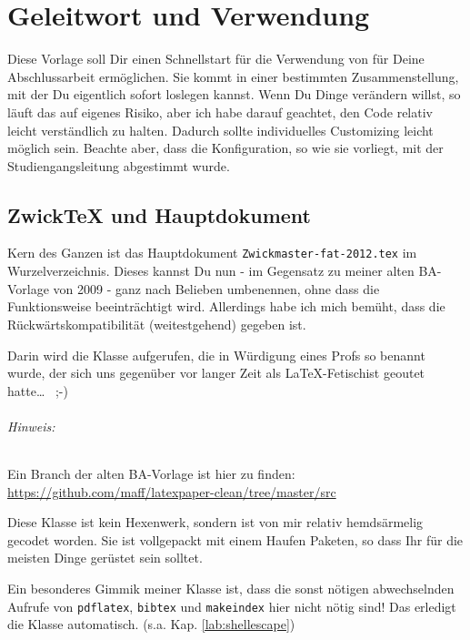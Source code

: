 

\nocite{*} 	



\chapter{Geleitwort und Verwendung}
\label{kap:Geleitwort}

Diese Vorlage soll Dir einen Schnellstart für die Verwendung von \latex für Deine Abschlussarbeit ermöglichen.  Sie kommt in einer bestimmten Zusammenstellung, mit der Du eigentlich sofort loslegen kannst. Wenn Du Dinge verändern willst, so läuft das auf eigenes Risiko, aber ich habe darauf geachtet, den Code relativ leicht verständlich zu halten. Dadurch sollte individuelles Customizing leicht möglich sein. Beachte aber, dass die Konfiguration, so wie sie vorliegt, mit der Studiengangsleitung abgestimmt wurde.

\section*{ZwickTeX und Hauptdokument}

Kern des Ganzen ist das Hauptdokument \texttt{Zwickmaster-fat-2012.tex} im Wurzelverzeichnis. Dieses kannst Du nun - im Gegensatz zu meiner alten BA-Vorlage von 2009 - ganz nach Belieben umbenennen, ohne dass die Funktionsweise beeinträchtigt wird. Allerdings habe ich mich bemüht, dass die Rückwärtskompatibilität (weitestgehend) gegeben ist.

Darin wird die Klasse \zwicktex\xspace aufgerufen, die in Würdigung eines Profs so benannt wurde, der sich uns gegenüber vor langer Zeit als \LaTeX-Fetischist geoutet hatte… ~;-)

\subparagraph*{Hinweis:} Ein Branch der alten BA-Vorlage ist hier zu finden: \\
\url{https://github.com/maff/latexpaper-clean/tree/master/src}

Diese Klasse ist kein Hexenwerk, sondern ist von mir relativ hemdsärmelig gecodet worden. Sie ist vollgepackt mit einem Haufen Paketen, so dass Ihr für die meisten Dinge gerüstet sein solltet. 

Ein besonderes Gimmik meiner Klasse ist, dass die sonst nötigen abwechselnden Aufrufe von \texttt{pdflatex}, \texttt{bibtex} und \texttt{makeindex} hier nicht nötig sind! Das erledigt die Klasse automatisch. (s.a. Kap. \ref{lab:shellescape})

